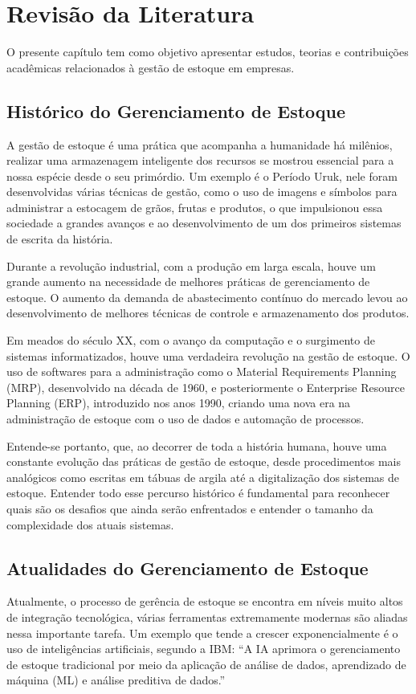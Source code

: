 \documentclass[
	12pt,				%
	openany,			%
	twoside,			%
	a4paper,			%
	english,			%
	brazil				%
	]{abntex2}
\begin{document}


\chapter{Revisão da Literatura}
O presente capítulo tem como objetivo apresentar estudos, teorias e contribuições acadêmicas relacionados à gestão de estoque em empresas.
\section{Histórico do Gerenciamento de Estoque}
A gestão de estoque é uma prática que acompanha a humanidade há milênios, realizar uma armazenagem inteligente dos recursos se mostrou essencial para a nossa espécie desde o seu primórdio. Um exemplo é o Período Uruk, nele foram desenvolvidas várias técnicas de gestão, como o uso de imagens e símbolos para administrar a estocagem de grãos, frutas e produtos, o que impulsionou essa sociedade a grandes avanços e ao desenvolvimento de um dos primeiros sistemas de escrita da história.

Durante a revolução industrial, com a produção em larga escala, houve um grande aumento na necessidade de melhores práticas de gerenciamento de estoque. O aumento da demanda de abastecimento contínuo do mercado levou ao desenvolvimento de melhores técnicas de controle e armazenamento dos produtos.

Em meados do século XX, com o avanço da computação e o surgimento de sistemas informatizados, houve uma verdadeira revolução na gestão de estoque. O uso de softwares para a administração como o Material Requirements Planning (MRP), desenvolvido na década de 1960, e posteriormente o Enterprise Resource Planning (ERP), introduzido nos anos 1990, criando uma nova era na administração de estoque com o uso de dados e automação de processos.

Entende-se portanto, que, ao decorrer de toda a história humana, houve uma constante evolução das práticas de gestão de estoque, desde procedimentos mais analógicos como escritas em tábuas de argila até a digitalização dos sistemas de estoque. Entender todo esse percurso histórico é fundamental para reconhecer quais são os desafios que ainda serão enfrentados e entender o tamanho da complexidade dos atuais sistemas.

\section{Atualidades do Gerenciamento de Estoque}
Atualmente, o processo de gerência de estoque se encontra em níveis muito altos de integração tecnológica, várias ferramentas extremamente modernas são aliadas nessa importante tarefa. Um exemplo que tende a crescer exponencialmente é o uso de inteligências artificiais, segundo a IBM: “A IA aprimora o gerenciamento de estoque tradicional por meio da aplicação de análise de dados, aprendizado de máquina (ML) e análise preditiva de dados.”
\end{document}

